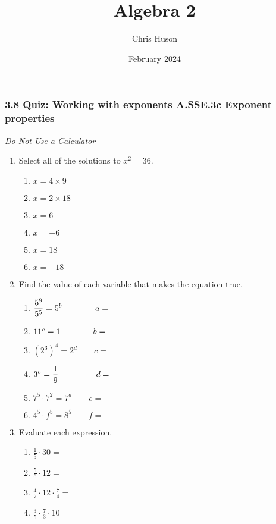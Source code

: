 \documentclass[12pt, twoside]{article}
\title{Algebra 2}
\author{Chris Huson}
\date{February 2024}
\begin{document}
\subsubsection*{3.8 Quiz: Working with exponents \hfill A.SSE.3c Exponent properties}
\emph{Do Not Use a Calculator}
\begin{enumerate}
\item Select all of the solutions to $x^2=36$.
    \begin{multicols}{2}
    \begin{enumerate}
        \item $x=4 \times 9$
        \item $x=2 \times 18$
        \item $x=6$
        \item $x=-6$
        \item $x=18$
        \item $x=-18$
    \end{enumerate}
    \end{multicols}

    \item Find the value of each variable that makes the equation true.
    \begin{multicols}{2}
    \begin{enumerate}[itemsep=0.5cm]
        \item $\displaystyle \frac{5^9}{5^5} = 5^b \hspace{1.4cm}  a=$
        \item $11^c=1 \hspace{1.4cm} b=$
        \item $(2^3)^4 = 2^d \qquad c=$
        \item $\displaystyle 3^e = \frac{1}{9} \hspace{1.6cm}  d=$
        \item $7^5 \cdot 7^2 = 7^a \qquad e=$
        \item $4^5 \cdot f^5 = 8^5 \qquad f=$
    \end{enumerate}
    \end{multicols} \vspace{0.5cm}

\item Evaluate each expression.
    \begin{multicols}{2}
    \begin{enumerate}[itemsep=0.5cm]
        \item $\displaystyle \frac{1}{5} \cdot 30=$
        \item $\displaystyle \frac{5}{6} \cdot 12=$
        \item $\displaystyle \frac{4}{7} \cdot 12 \cdot \frac{7}{4}=$
        \item $\displaystyle \frac{3}{5} \cdot \frac{7}{3} \cdot 10=$
    \end{enumerate}
    \end{multicols} \vspace{0.5cm}


\end{enumerate}
\end{document}
